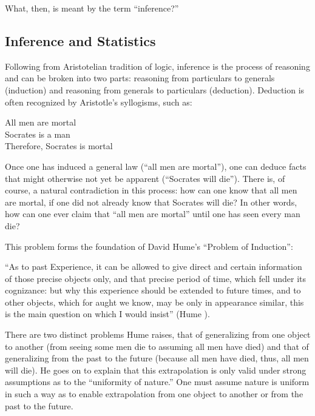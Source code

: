 \documentclass[a4paper,12pt]{article}
\begin{document}
What, then, is meant by the term ``inference?''

\subsection{Inference and Statistics}

Following from Aristotelian tradition of logic, inference is the process of reasoning and can be broken into two parts: reasoning from particulars to generals (induction) and reasoning from generals to particulars (deduction). Deduction is often recognized by Aristotle's syllogisms, such as:

\begin{displayquote}
All men are mortal \\
Socrates is a man  \\
Therefore, Socrates is mortal
\end{displayquote}

Once one has induced a general law (``all men are mortal''), one can deduce facts that might otherwise not yet be apparent (``Socrates will die''). There is, of course, a natural contradiction in this process: how can one know that all men are mortal, if one did not already know that Socrates will die? In other words, how can one ever claim that ``all men are mortal'' until one has seen every man die?

This problem forms the foundation of David Hume's ``Problem of Induction'':

\begin{displayquote}
``As to past Experience, it can be allowed to give direct and certain information of those precise objects only, and that precise period of time, which fell under its cognizance: but why this experience should be extended to future times, and to other objects, which for aught we know, may be only in appearance similar, this is the main question on which I would insist'' (Hume ).
\end{displayquote}

There are two distinct problems Hume raises, that of generalizing from one object to another (from seeing some men die to assuming all men have died) and that of generalizing from the past to the future (because all men have died, thus, all men will die). He goes on to explain that this extrapolation is only valid under strong assumptions as to the ``uniformity of nature.'' One must assume nature is uniform in such a way as to enable extrapolation from one object to another or from the past to the future.
\end{document}
